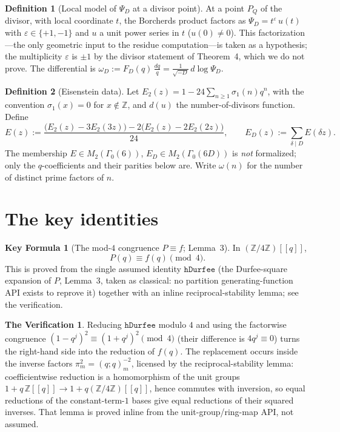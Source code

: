 \documentclass[11pt]{article}
\newcommand{\Z}{\mathbb{Z}}
\theoremstyle{definition}
\newtheorem{defn}{Definition}
\newtheorem{keyformula}{Key Formula}
\newtheorem{TV}{The Verification}
\begin{document}
\begin{defn}[Local model of $\Psi_D$ at a divisor point]\label{def:local}
At a point $P_Q$ of the divisor, with local coordinate $t$, the Borcherds product factors as
$\Psi_D=t^{\varepsilon}\,u(t)$ with $\varepsilon\in\{+1,-1\}$ and $u$ a unit power series in $t$
($u(0)\ne0$). This factorization---the only geometric input to the residue computation---is taken
as a hypothesis; the multiplicity $\varepsilon$ is $\pm1$ by the divisor statement of Theorem~4,
which we do not prove. The differential is $\omega_D:=F_D(q)\,\frac{dq}{q}=\frac{1}{\sqrt{-D}}\,
d\log\Psi_D$.
\end{defn}

\begin{defn}[Eisenstein data]\label{def:eis}
Let $E_2(z)=1-24\sum_{n\ge1}\sigma_1(n)q^n$, with the convention $\sigma_1(x)=0$ for $x\notin\Z$,
and $d(u)$ the number-of-divisors function. Define
\[
E(z):=\frac{\bigl(E_2(z)-3E_2(3z)\bigr)-2\bigl(E_2(z)-2E_2(2z)\bigr)}{24},
\qquad
E_D(z):=\sum_{\delta\mid D}E(\delta z).
\]
The membership $E\in M_2(\Gamma_0(6))$, $E_D\in M_2(\Gamma_0(6D))$ is \emph{not} formalized; only
the $q$-coefficients and their parities below are. Write $\omega(n)$ for the number of distinct
prime factors of $n$.
\end{defn}

\section*{The key identities}


\begin{keyformula}[The mod-$4$ congruence $P\equiv f$; Lemma~3]\label{KF:mod4}
In $(\Z/4\Z)[[q]]$,
\[
P(q)\equiv f(q)\pmod4 .
\]
This is proved from the single assumed identity $\mathtt{hDurfee}$ (the Durfee-square expansion of
$P$, Lemma~3, taken as classical: no partition generating-function API exists to reprove it)
together with an inline reciprocal-stability lemma; see the verification.
\end{keyformula}
\begin{TV}
Reducing $\mathtt{hDurfee}$ modulo $4$ and using the factorwise congruence
$(1-q^j)^2\equiv(1+q^j)^2\pmod4$ (their difference is $4q^j\equiv0$) turns the right-hand side
into the reduction of $f(q)$. The replacement occurs inside the inverse factors
$\pi_m^2=(q;q)_m^{-2}$, licensed by the reciprocal-stability lemma: coefficientwise reduction is a
homomorphism of the unit groups $1+q\,\Z[[q]]\to1+q(\Z/4\Z)[[q]]$, hence commutes with inversion,
so equal reductions of the constant-term-$1$ bases give equal reductions of their squared
inverses. That lemma is proved inline from the unit-group/ring-map API, not assumed.
\end{TV}
\end{document}
